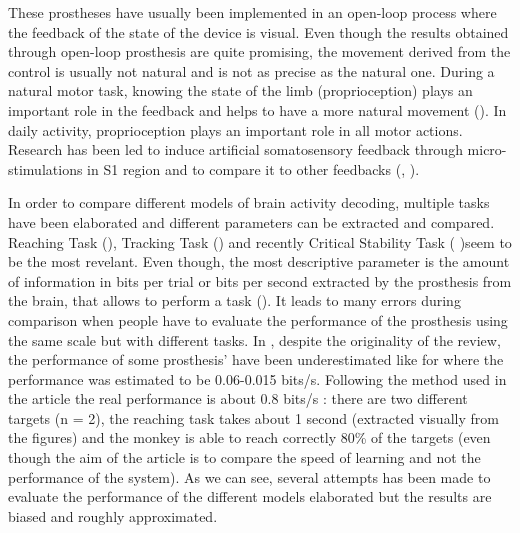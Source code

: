 \documentclass[preprint,12pt]{elsarticle}
\begin{document}
These prostheses have usually been implemented in an open-loop process where the feedback of the state of the device is visual. Even though the results obtained through open-loop prosthesis are quite promising, the movement derived from the control is usually not natural and is not as precise as the natural one. During a natural motor task, knowing the state of the limb (proprioception) plays an important role in the feedback and helps to have a more natural movement (\citet{Scheidt2005}). In daily activity, proprioception plays an important role in all motor actions. Research has been led to induce artificial somatosensory feedback through micro-stimulations in S1 region and to compare it to other feedbacks (\citet{Dadarlat2015}, \citet{Godlove2014}).

In order to compare different models of brain activity decoding, multiple tasks have been elaborated and different parameters can be extracted and compared. Reaching Task (\citet{Kao2015}), Tracking Task (\citet{ODoherty2009}) and recently Critical Stability Task (\citet{Quick2014} )seem to be the most revelant. Even though, the most descriptive parameter is the amount of information in bits per trial or bits per second extracted by the prosthesis from the brain, that allows to perform a task (\citet{Georgopoulos1988}). It leads to many errors during comparison when people have to evaluate the performance of the prosthesis using the same scale but with different tasks. In \citet{Tehovnik2013}, despite the originality of the review, the performance of some prosthesis' have been underestimated like for \citet{ODoherty2009} where the performance was estimated to be 0.06-0.015 bits/s. Following the method used in the article the real performance is about 0.8 bits/s : there are two different targets (n = 2), the reaching task takes about 1 second (extracted visually from the figures) and the monkey is able to reach correctly 80\% of the targets (even though the aim of the article is to compare the speed of learning and not the performance of the system). As we can see, several attempts has been made to evaluate the performance of the different models elaborated but the results are biased and roughly approximated.



\end{document}
